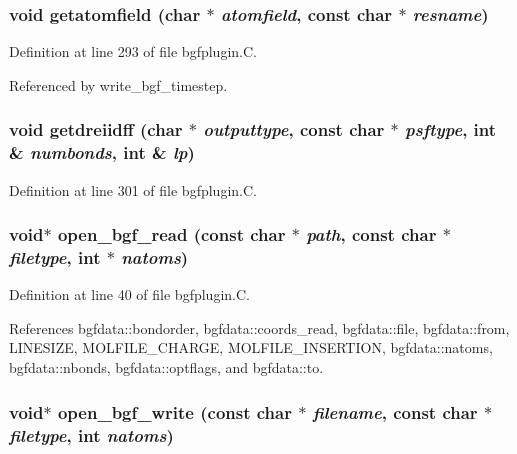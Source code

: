 \subsubsection{\setlength{\rightskip}{0pt plus 5cm}void getatomfield (char $\ast$ {\em atomfield}, const char $\ast$ {\em resname})}\label{bgfplugin_8C_a10}




Definition at line 293 of file bgfplugin.C.

Referenced by write\_\-bgf\_\-timestep.
\subsubsection{\setlength{\rightskip}{0pt plus 5cm}void getdreiidff (char $\ast$ {\em outputtype}, const char $\ast$ {\em psftype}, int \& {\em numbonds}, int \& {\em lp})\hspace{0.3cm}{\tt  [static]}}\label{bgfplugin_8C_a11}




Definition at line 301 of file bgfplugin.C.
\subsubsection{\setlength{\rightskip}{0pt plus 5cm}void$\ast$ open\_\-bgf\_\-read (const char $\ast$ {\em path}, const char $\ast$ {\em filetype}, int $\ast$ {\em natoms})\hspace{0.3cm}{\tt  [static]}}\label{bgfplugin_8C_a2}




Definition at line 40 of file bgfplugin.C.

References bgfdata::bondorder, bgfdata::coords\_\-read, bgfdata::file, bgfdata::from, LINESIZE, MOLFILE\_\-CHARGE, MOLFILE\_\-INSERTION, bgfdata::natoms, bgfdata::nbonds, bgfdata::optflags, and bgfdata::to.
\subsubsection{\setlength{\rightskip}{0pt plus 5cm}void$\ast$ open\_\-bgf\_\-write (const char $\ast$ {\em filename}, const char $\ast$ {\em filetype}, int {\em natoms})\hspace{0.3cm}{\tt  [static]}}\label{bgfplugin_8C_a8}




